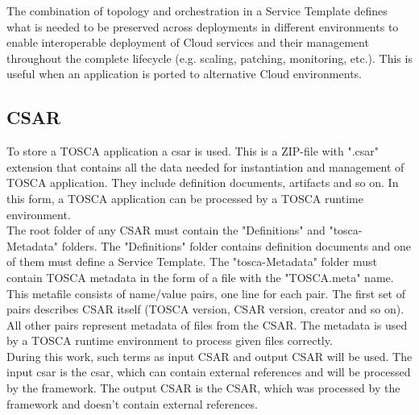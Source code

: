 The combination of topology and orchestration in a Service Template defines what is needed to be preserved across deployments in different environments to enable interoperable deployment of Cloud services and their management throughout the complete lifecycle (e.g. scaling, patching, monitoring, etc.).
This is useful when an application is ported to alternative Cloud environments.~\cite{TOSCA-v1.0_book} \\
%
\subsection*{CSAR} 
%
To store a TOSCA application a \gls{csar}\label{sec:csar} is used.
This is a ZIP-file with ".csar" extension that contains all the data needed for instantiation and management of TOSCA application.
They include definition documents, artifacts and so on.
In this form, a TOSCA application can be processed by a TOSCA runtime environment.\\
The root folder of any CSAR must contain the "Definitions" and "\gls{tosca}-Metadata" folders.
The "Definitions" folder contains definition documents and one of them must define a Service Template.
The "\gls{tosca}-Metadata" folder must contain TOSCA metadata in the form of a file with the "TOSCA.meta" name.
This metafile consists of name/value pairs, one line for each pair. 
The first set of pairs describes CSAR itself (TOSCA version, CSAR version, creator and so on). 
All other pairs represent metadata of files from the CSAR. 
The metadata is used by a TOSCA runtime environment to process given files correctly.\\
%
During this work, such terms as input CSAR and output CSAR will be used.
The input \gls{csar} is the \gls{csar}, which can contain external references and will be processed by the framework. %
The output CSAR is the CSAR, which was processed by the framework and doesn't contain external references. %


